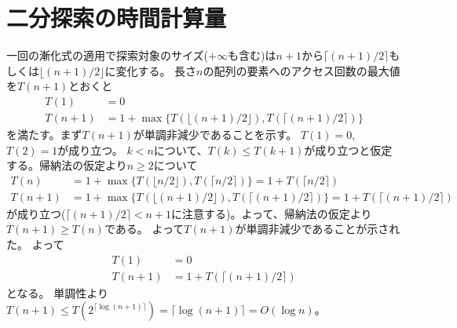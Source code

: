 \documentclass[a4paper,twoside,onecolumn,openany,article,10pt]{memoir}
\theoremstyle{remark}
\begin{document}
\section{二分探索の時間計算量}
一回の漸化式の適用で探索対象のサイズ($+\infty$も含む)は$n+1$から$\lceil (n+1)/2\rceil$もしくは$\lfloor (n+1)/2\rfloor$に変化する。
長さ$n$の配列の要素へのアクセス回数の最大値を$T(n+1)$とおくと
\begin{align*}
T(1)  &= 0\\
T(n+1)&= 1 + \max\{T(\lfloor (n+1)/2\rfloor), T(\lceil (n+1)/2\rceil)\}
\end{align*}
を満たす。まず$T(n+1)$が単調非減少であることを示す。
$T(1)=0$, $T(2)=1$が成り立つ。
$k<n$について、$T(k)\le T(k+1)$が成り立つと仮定する。帰納法の仮定より$n\ge 2$について
\begin{align*}
T(n)&= 1 + \max\{T(\lfloor n/2\rfloor), T(\lceil n/2\rceil)\} = 1 + T(\lceil n/2\rceil)\\
T(n+1)&= 1 + \max\{T(\lfloor (n+1)/2\rfloor), T(\lceil (n+1)/2\rceil)\}= 1 + T(\lceil (n+1)/2\rceil)
\end{align*}
が成り立つ($\lceil(n+1)/2\rceil < n+1$に注意する)。よって、帰納法の仮定より$T(n+1)\ge T(n)$である。
よって$T(n+1)$が単調非減少であることが示された。
よって
\begin{align*}
T(1)  &= 0\\
T(n+1)&= 1 + T(\lceil (n+1)/2\rceil)
\end{align*}
となる。
単調性より $T(n+1)\le T(2^{\lceil \log (n+1)\rceil}) = \lceil \log (n+1) \rceil = O(\log n)$。
\end{document}
